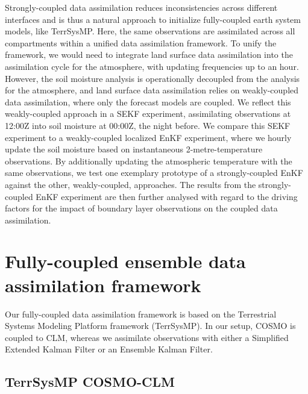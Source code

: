 \documentclass[HESSD, manuscript]{copernicus}
\begin{document}
Strongly-coupled data assimilation reduces inconsistencies across different interfaces \citep{sawada_hydrometeorology_2018, lin_characteristics_2018, lin_examining_2019} and is thus a natural approach to initialize fully-coupled earth system models, like TerrSysMP. 
Here, the same observations are assimilated across all compartments within a unified data assimilation framework.
To unify the framework, we would need to integrate land surface data assimilation into the assimilation cycle for the atmosphere, with updating frequencies up to an hour.
However, the soil moisture analysis is operationally decoupled from the analysis for the atmosphere, and land surface data assimilation relies on weakly-coupled data assimilation, where only the forecast models are coupled.
We reflect this weakly-coupled approach in a SEKF experiment, assimilating observations at 12:00Z into soil moisture at 00:00Z, the night before.
We compare this SEKF experiment to a weakly-coupled localized EnKF experiment, where we hourly update the soil moisture based on instantaneous 2-metre-temperature observations.
By additionally updating the atmospheric temperature with the same observations, we test one exemplary prototype of a strongly-coupled EnKF against the other, weakly-coupled, approaches.
The results from the strongly-coupled EnKF experiment are then further analysed with regard to the driving factors for the impact of boundary layer observations on the coupled data assimilation.

\section{Fully-coupled ensemble data assimilation framework}
Our fully-coupled data assimilation framework is based on the Terrestrial Systems Modeling Platform framework (TerrSysMP).
In our setup, COSMO is coupled to CLM, whereas we assimilate observations with either a Simplified Extended Kalman Filter or an Ensemble Kalman Filter.


\subsection{TerrSysMP COSMO-CLM}
\end{document}
